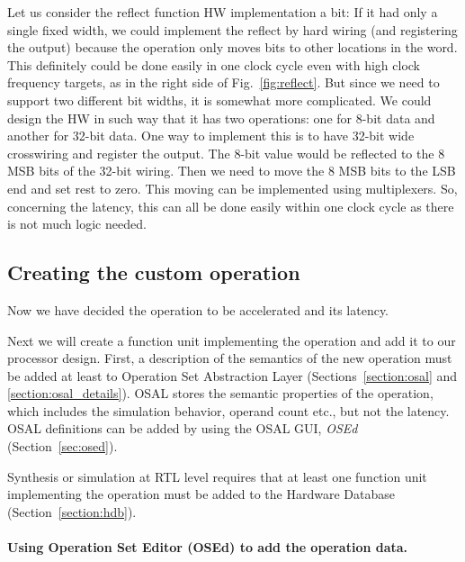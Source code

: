 \documentclass[twoside]{tceusermanual}
\begin{document}
Let us consider the reflect function HW implementation a bit: If it had
only a single fixed width, we could implement the reflect by hard
wiring (and registering the output)
because the operation only moves bits to other locations in the
word. This definitely could be done easily in one clock cycle even with
high clock frequency targets, as in the right side
of Fig.~\ref{fig:reflect}. But since we need to support two different bit widths,
it is somewhat more complicated. We could design the HW in such way that
it has two operations: one for 8-bit data and another for 32-bit
data. One way to implement this is to have 32-bit wide crosswiring and
register the output. The 8-bit value would be reflected to the 8 MSB
bits of the 32-bit wiring. Then we need to move the 8 MSB bits to the
LSB end and set rest to zero. This moving can be implemented using
multiplexers. So, concerning the latency, this can all be done easily
within one clock cycle as there is not much logic needed.


\subsection{Creating the custom operation}
\label{section:customOperations}

Now we have decided the operation to be accelerated and its latency.

Next we will create a function unit implementing the
operation and add it to our processor design. First, a description of
the semantics of the new operation must be added at least to Operation
Set Abstraction Layer (Sections~\ref{section:osal} and
\ref{section:osal_details}). OSAL stores the semantic properties of
the operation, which includes the simulation behavior, operand count
etc., but not the latency. OSAL definitions can be added by using the
OSAL GUI, \emph{OSEd} (Section~\ref{sec:osed}).

Synthesis or simulation at RTL level requires that at least one
function unit implementing the operation must be added to the Hardware
Database (Section~\ref{section:hdb}).


\paragraph{Using Operation Set Editor (OSEd) to add the operation data.}
\end{document}

